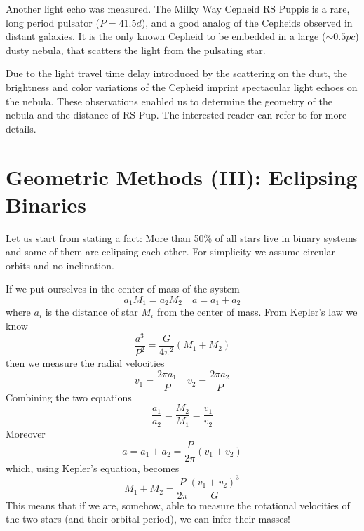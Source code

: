 \par Another light echo was measured. The Milky Way Cepheid RS Puppis is a rare, long period pulsator ($P=41.5\unit{d}$), and a good analog of the Cepheids observed in distant galaxies. It is the only known Cepheid to be embedded in a large ($\sim 0.5\unit{pc}$) dusty nebula, that scatters the light from the pulsating star.
\par Due to the light travel time delay introduced by the scattering on the dust, the brightness and color variations of the Cepheid imprint spectacular light echoes on the nebula. These observations enabled us to determine the geometry of the nebula and the distance of RS Pup. The interested reader can refer to \cite{kervella2020distancelongperiodcepheid} for more details.
\section{Geometric Methods (III): Eclipsing Binaries}
Let us start from stating a fact: More than 50\% of all stars live in binary systems and some of them are eclipsing each other. For simplicity we assume circular orbits and no inclination.
\par If we put ourselves in the center of mass of the system
\begin{equation*}
    a_{1}M_{1} = a_{2}M_{2} \quad a=a_{1}+a_{2}
\end{equation*}
where $a_{i}$ is the distance of star $M_{i}$ from the center of mass. From Kepler's law we know 
\begin{equation*}
    \frac{a^{3}}{P^{2}} = \frac{G}{4\pi^{2}}(M_{1}+M_{2})
\end{equation*}
then we measure the radial velocities
\begin{equation*}
    v_{1} = \frac{2\pi a_{1}}{P} \quad v_{2} = \frac{2\pi a_{2}}{P}
\end{equation*}
Combining the two equations 
\begin{equation*}
    \frac{a_{1}}{a_{2}} = \frac{M_{2}}{M_{1}} = \frac{v_{1}}{v_{2}}
\end{equation*}
Moreover
\begin{equation*}
    a = a_{1}+a_{2} = \frac{P}{2\pi}(v_{1}+v_{2})
\end{equation*}
which, using Kepler's equation, becomes 
\begin{equation}
    M_{1}+M_{2} = \frac{P}{2\pi}\frac{(v_{1}+v_{2})^{3}}{G}
    \label{eq:eclipsingmasses}
\end{equation} 
This means that if we are, somehow, able to measure the rotational velocities of the two stars (and their orbital period), we can infer their masses!
